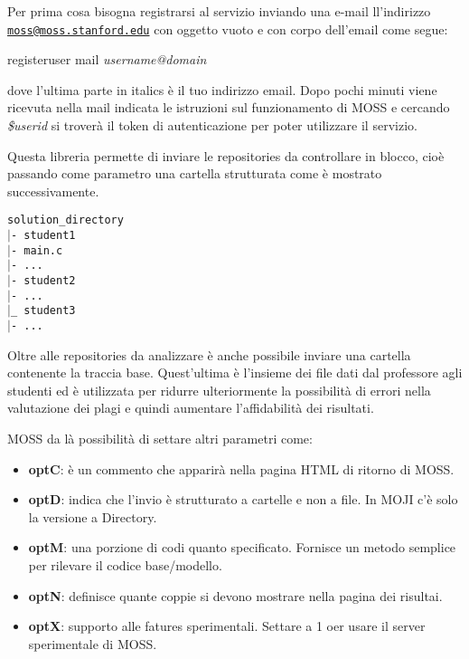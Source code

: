 			Per prima cosa bisogna registrarsi al servizio inviando una e-mail ll'indirizzo \href{mailto:moss@moss.stanford.edu}{\nolinkurl{moss@moss.stanford.edu}} con oggetto vuoto e con corpo dell'email come segue:
			\begin{tcolorbox}
				registeruser 
				mail \textit{username@domain}
			\end{tcolorbox}
			dove l'ultima parte in italics è il tuo indirizzo email.
			Dopo pochi minuti viene ricevuta nella mail indicata le istruzioni sul funzionamento di MOSS e cercando \textit{\$userid} si troverà il token di autenticazione per poter utilizzare il servizio.
			
			Questa libreria permette di inviare le repositories da controllare in blocco, cioè passando come parametro una cartella strutturata come è mostrato successivamente.
			
			\begin{tcolorbox}
				\texttt{\tab solution\_directory\\ 
						\tab $\vert$- student1\\
						\tab[1.5cm] $\vert$- main.c\\
						\tab[1.5cm] $\vert$- ...\\
						\tab $\vert$- student2\\
						\tab[1.5cm] $\vert$- ...\\
						\tab $\vert$\_ student3\\
						\tab[1.5cm] $\vert$- ...
					}
			\end{tcolorbox}
			
			Oltre alle repositories da analizzare è anche possibile inviare una cartella contenente la traccia base. Quest'ultima è l'insieme dei file dati dal professore agli studenti ed è utilizzata per ridurre ulteriormente la possibilità di errori nella valutazione dei plagi e quindi aumentare l'affidabilità dei risultati.
			
			MOSS da là possibilità di settare altri parametri come: 
			\begin{itemize}
				\item \textbf{optC}: è un commento che apparirà nella pagina HTML di ritorno di MOSS.
				\item \textbf{optD}: indica che l'invio è strutturato a cartelle e non a file. In MOJI c'è solo la versione a Directory.
				\item \textbf{optM}: una porzione di codi quanto specificato. Fornisce un metodo semplice per rilevare il codice base/modello.
				\item \textbf{optN}: definisce quante coppie si devono mostrare nella pagina dei risultai.
				\item \textbf{optX}: supporto alle fatures sperimentali. Settare a 1 oer usare il server sperimentale di MOSS.
			\end{itemize}
			
